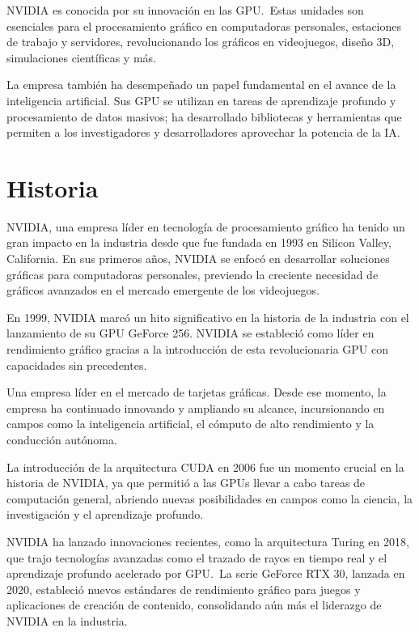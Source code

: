 \documentclass[letterpaper, 12pt]{article}
\begin{document}
NVIDIA es conocida por su innovación en las GPU.~Estas unidades
son esenciales para el procesamiento gráfico en computadoras
personales, estaciones de trabajo y servidores, revolucionando
los gráficos en videojuegos, diseño 3D, simulaciones científicas
y más.

La empresa también ha desempeñado un papel fundamental en
el avance de la inteligencia artificial. Sus GPU se utilizan
en tareas de aprendizaje profundo y procesamiento de datos
masivos; ha desarrollado bibliotecas y herramientas que
permiten a los investigadores y desarrolladores aprovechar
la potencia de la IA.\@{}

\section{Historia}

NVIDIA, una empresa líder en tecnología de procesamiento gráfico
ha tenido un gran impacto en la industria desde que fue fundada
en 1993 en Silicon Valley, California. En sus primeros años,
NVIDIA se enfocó en desarrollar soluciones gráficas para
computadoras personales, previendo la creciente necesidad de
gráficos avanzados en el mercado emergente de los videojuegos.

En 1999, NVIDIA marcó un hito significativo en la historia de la
industria con el lanzamiento de su GPU GeForce 256. NVIDIA se
estableció como líder en rendimiento gráfico gracias a la
introducción de esta revolucionaria GPU con capacidades sin
precedentes.

Una empresa líder en el mercado de tarjetas gráficas. Desde ese
momento, la empresa ha continuado innovando y ampliando su alcance,
incursionando en campos como la inteligencia artificial, el cómputo
de alto rendimiento y la conducción autónoma.

La introducción de la arquitectura CUDA en 2006 fue un momento
crucial en la historia de NVIDIA, ya que permitió a las GPUs
llevar a cabo tareas de computación general, abriendo nuevas posibilidades en campos como la ciencia, la investigación y el aprendizaje profundo.

NVIDIA ha lanzado innovaciones recientes, como la arquitectura
Turing en 2018, que trajo tecnologías avanzadas como el trazado
de rayos en tiempo real y el aprendizaje profundo acelerado por
GPU.~La serie GeForce RTX 30, lanzada en 2020,
estableció nuevos estándares de rendimiento gráfico para
juegos y aplicaciones de creación de contenido, consolidando
aún más el liderazgo de NVIDIA en la industria.
\end{document}
